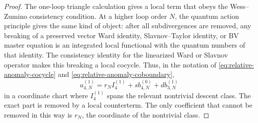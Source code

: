 \begin{proof}
The one-loop triangle calculation gives a local term that obeys the
Wess--Zumino consistency condition.  At a higher loop order \(N\), the quantum
action principle gives the same kind of object: after all subdivergences are
removed, any breaking of a preserved vector Ward identity, Slavnov--Taylor
identity, or BV master equation is an integrated local functional with the
quantum numbers of that identity.  The consistency identity for the linearized
Ward or Slavnov operator makes this breaking a local cocycle.  Thus, in the
notation of \eqref{eq:relative-anomaly-cocycle} and
\eqref{eq:relative-anomaly-coboundary},
\[
  a_{4,N}^{(1)}
  =
  r_N I_4^{(1)}
  +
  s b_{4,N}^{(0)}
  +
  d b_{3,N}^{(1)}
\]
in a coordinate chart where \(I_4^{(1)}\) spans the relevant nontrivial
descent class.  The exact part is removed by a local counterterm.  The only
coefficient that cannot be removed in this way is \(r_N\), the coordinate of
the nontrivial class.


\end{proof}

